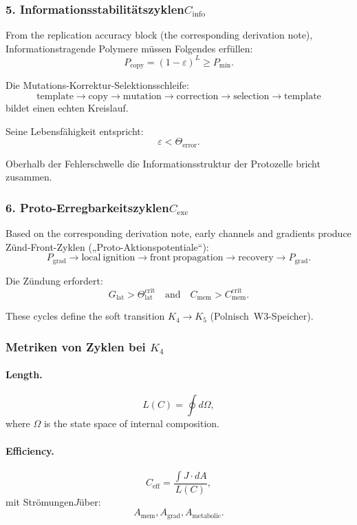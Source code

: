 \subsubsection{5. Informationsstabilitätszyklen$C_{\mathrm{info}}$}

From the replication accuracy block (the corresponding derivation note),
Informationstragende Polymere müssen Folgendes erfüllen:
\[
  P_{\mathrm{copy}}=(1-\varepsilon)^L \ge P_{\min}.
\]

Die Mutations-Korrektur-Selektionsschleife:
\[
  \mathrm{template}
  \to \mathrm{copy}
  \to \mathrm{mutation}
  \to \mathrm{correction}
  \to \mathrm{selection}
  \to \mathrm{template}
\]
bildet einen echten Kreislauf.

Seine Lebensfähigkeit entspricht:
\[
  \varepsilon < \Theta_{\mathrm{error}}.
\]

Oberhalb der Fehlerschwelle die Informationsstruktur der Protozelle
bricht zusammen.

\subsubsection{6. Proto-Erregbarkeitszyklen$C_{\mathrm{exc}}$}

Based on the corresponding derivation note, early channels and gradients produce
Zünd-Front-Zyklen („Proto-Aktionspotentiale“):
\[
  P_{\mathrm{grad}} \to
  \mathrm{local\ ignition} \to
  \mathrm{front\ propagation} \to
  \mathrm{recovery} \to
  P_{\mathrm{grad}}.
\]

Die Zündung erfordert:
\[
  G_{\mathrm{lat}} > \Theta^{\mathrm{crit}}_{\mathrm{lat}}
\quad\text{and}\quad
  C_{\mathrm{mem}}>C_{\mathrm{mem}}^{\mathrm{crit}}.
\]

These cycles define the soft transition $K_4\to K_5$ 
(Polnisch~W3-Speicher).

\subsubsection{Metriken von Zyklen bei \texorpdfstring{$K_4$}{K_4}}

\paragraph{Length.}
\[
  L(C)=\oint d\Omega,
\]
where $\Omega$ is the state space of internal composition.

\paragraph{Efficiency.}
\[
  C_{\mathrm{eff}}
    =\frac{\int J\cdot dA}{L(C)},
\]
mit Strömungen$J$über:
\[
  A_{\mathrm{mem}}, A_{\mathrm{grad}}, A_{\mathrm{metabolic}}.
\]

